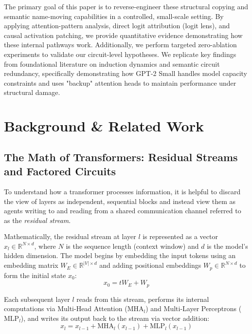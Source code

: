 \documentclass[11pt]{article}
\begin{document}
The primary goal of this paper is to reverse-engineer these structural copying and semantic name-moving capabilities in a controlled, small-scale setting. By applying attention-pattern analysis, direct logit attribution (logit lens), and causal activation patching, we provide quantitative evidence demonstrating how these internal pathways work. Additionally, we perform targeted zero-ablation experiments to validate our circuit-level hypotheses. We replicate key findings from foundational literature on induction dynamics and semantic circuit redundancy, specifically demonstrating how GPT-2 Small handles model capacity constraints and uses "backup" attention heads to maintain performance under structural damage.

\section{Background \& Related Work}

\subsection{The Math of Transformers: Residual Streams and Factored Circuits}

To understand how a transformer processes information, it is helpful to discard the view of layers as independent, sequential blocks and instead view them as agents writing to and reading from a shared communication channel referred to as the \textit{residual stream}.

Mathematically, the residual stream at layer $l$ is represented as a vector $x_l \in \mathbb{R}^{N \times d}$, where $N$ is the sequence length (context window) and $d$ is the model's hidden dimension. The model begins by embedding the input tokens using an embedding matrix $W_E \in \mathbb{R}^{|V| \times d}$ and adding positional embeddings $W_p \in \mathbb{R}^{N \times d}$ to form the initial state $x_0$:
\begin{equation}
    x_0 = t W_E + W_p
\end{equation}

Each subsequent layer $l$ reads from this stream, performs its internal computations via Multi-Head Attention ($\text{MHA}_l$) and Multi-Layer Perceptrons ($\text{MLP}_l$), and writes its output back to the stream via vector addition:
\begin{equation}
    x_l = x_{l-1} + \text{MHA}_l(x_{l-1}) + \text{MLP}_l(x_{l-1})
\end{equation}
\end{document}

